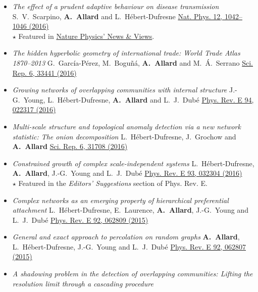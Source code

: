 \documentclass[11pt]{article}
\begin{document}
\begin{itemize}[itemsep=0.5em]
%
  \item \textit{The effect of a prudent adaptive behaviour on disease transmission}\split
  S.~V.~Scarpino, \textbf{A.~Allard} and L.~H\'ebert-Dufresne\split
  \href{http://dx.doi.org/10.1038/nphys3832}{Nat. Phys. 12, 1042--1046 (2016)}\\
  {\footnotesize $\star$ Featured in \href{http://dx.doi.org/10.1038/nphys3939}{Nature Physics' News \& Views}.}%
%
  \item \textit{The hidden hyperbolic geometry of international trade: World Trade Atlas 1870--2013}\split
  G.~Garc\'ia-P\'erez, M.~Bogu\~n\'a, \textbf{A.~Allard} and M.~\'A.~Serrano\split
  \href{http://dx.doi.org/10.1038/srep33441}{Sci. Rep. 6, 33441 (2016)}
%
  \item \textit{Growing networks of overlapping communities with internal structure}\split
  J.-G.~Young, L.~H\'ebert-Dufresne, \textbf{A.~Allard} and L.~J.~Dub\'e\split
  \href{http://dx.doi.org/10.1103/PhysRevE.94.022317}{Phys. Rev. E 94, 022317 (2016)}
%
  \item \textit{Multi-scale structure and topological anomaly detection via a new network statistic: The onion decomposition}\split
  L.~H\'ebert-Dufresne, J.~Grochow and \textbf{A.~Allard}\split
  \href{http://dx.doi.org/10.1038/srep31708}{Sci. Rep. 6, 31708 (2016)}
%
  \item \textit{Constrained growth of complex scale-independent systems}\split
  L.~H\'ebert-Dufresne, \textbf{A.~Allard}, J.-G.~Young and L.~J.~Dub\'e\split
  \href{http://dx.doi.org/10.1103/PhysRevE.93.032304}{Phys. Rev. E 93, 032304 (2016)}\\
  {\footnotesize $\star$ Featured in the \textit{Editors' Suggestions} section of Phys. Rev. E.}
%
  \item \textit{Complex networks as an emerging property of hierarchical preferential attachment}\split
  L.~H\'ebert-Dufresne, E.~Laurence, \textbf{A.~Allard}, J.-G.~Young and L.~J.~Dub\'e\split
  \href{http://dx.doi.org/10.1103/PhysRevE.92.062809}{Phys. Rev. E 92, 062809 (2015)}
%
  \item \textit{General and exact approach to percolation on random graphs}\split
  \textbf{A.~Allard}, L.~H\'ebert-Dufresne, J.-G.~Young and L.~J.~Dub\'e\split
  \href{http://dx.doi.org/10.1103/PhysRevE.92.062807}{Phys. Rev. E 92, 062807 (2015)}
%
  \item \textit{A shadowing problem in the detection of overlapping communities: Lifting the resolution limit through a cascading procedure}\split

\end{itemize}
\end{document}
